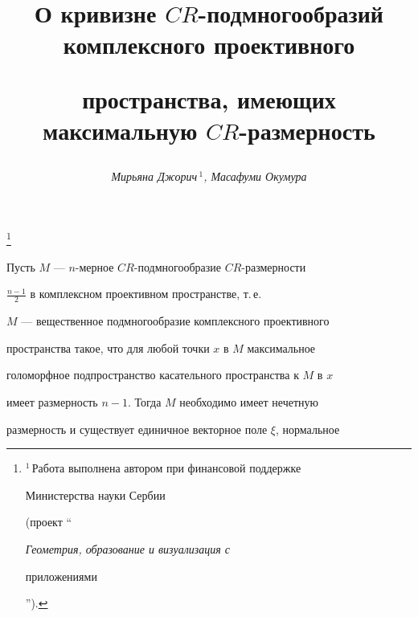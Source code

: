 




\author{\it Мирьяна Джорич\,${}^1$, Масафуми Окумура}




\title{О кривизне $CR$-подмногообразий комплексного проективного


пространства, имеющих максимальную $CR$-размерность}


\thanks{${}^1$\,Работа выполнена автором при финансовой поддержке


Министерства науки Сербии


(проект ``{\it Геометрия, образование и визуализация с


приложениями}'').}





\date{}




\pagestyle{plain} %







\maketitle


\label{begin}





\setcounter{section}{-1}








Пусть $M$ --- $n$-мерное $CR$-подмногообразие $CR$-размерности


$\frac{n-1}{2}$ в комплексном проективном пространстве, т.\,е.


$M$ --- вещественное подмногообразие комплексного проективного


пространства такое, что для любой точки $x$ в $M$ максимальное


голоморфное  подпространство касательного пространства к $M$ в $x$


имеет размерность $n-1$. Тогда $M$ необходимо имеет нечетную


размерность и существует единичное векторное поле $\xi$, нормальное


